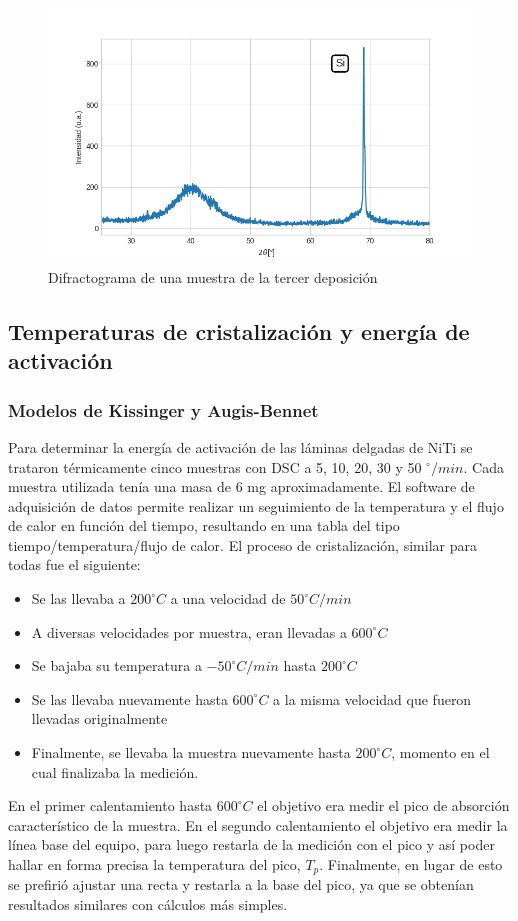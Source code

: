\documentclass[12pt]{article}
\theoremstyle{definition}
\theoremstyle{remark}
\begin{document}
\begin{figure}[H]
 	\centering
	\includegraphics[scale=0.6]{img/RX_amorfo.png}
 	\caption{Difractograma de una muestra de la tercer deposición}
	\label{amorfo}
\end{figure}

\subsection{Temperaturas de cristalización y energía de activación}
\subsubsection{Modelos de Kissinger y Augis-Bennet}
Para determinar la energía de activación de las láminas delgadas de NiTi se trataron térmicamente cinco muestras con DSC a 5, 10, 20, 30 y 50 $^{\circ}/min$. Cada muestra utilizada tenía una masa de 6 mg aproximadamente. El software de adquisición de datos permite realizar un seguimiento de la temperatura y el flujo de calor en función del tiempo, resultando en una tabla del tipo tiempo/temperatura/flujo de calor. El proceso de cristalización, similar para todas fue el siguiente:

\begin{itemize}
\item Se las llevaba a $200^{\circ}C$ a una velocidad de $50^{\circ}C/min$
\item A diversas velocidades por muestra, eran llevadas a $600^{\circ}C$
\item Se bajaba su temperatura a $-50^{\circ}C/min$ hasta $200^{\circ}C$
\item Se las llevaba nuevamente hasta $600^{\circ}C$ a la misma velocidad que fueron llevadas originalmente
\item Finalmente, se llevaba la muestra nuevamente hasta $200^{\circ}C$, momento en el cual finalizaba la medición.
\end{itemize}
En el primer calentamiento hasta $600^{\circ}C$ el objetivo era medir el pico de absorción característico de la muestra. En el segundo calentamiento el objetivo era medir la línea base del equipo, para luego restarla de la medición con el pico y así poder hallar en forma precisa la temperatura del pico, $T_p$. Finalmente, en lugar de esto se prefirió ajustar una recta y restarla a la base del pico, ya que se obtenían resultados similares con cálculos más simples.
\end{document}
